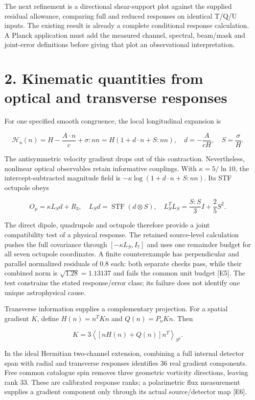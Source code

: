 \documentclass[
  10pt,
]{article}
\begin{document}
The next refinement is a directional shear-support plot against the
supplied residual allowance, comparing full and reduced responses on
identical T/Q/U inputs. The existing result is already a complete
conditional response calculation. A Planck application must add the
measured channel, spectral, beam/mask and joint-error definitions before
giving that plot an observational interpretation.

\hypertarget{kinematic-quantities-from-optical-and-transverse-responses}{%
\section{2. Kinematic quantities from optical and transverse
responses}\label{kinematic-quantities-from-optical-and-transverse-responses}}

For one specified smooth congruence, the local longitudinal expansion is

\[
\mathcal H_u(n)=H-\frac{A\cdot n}{c}+\sigma:nn
=H(1+d\cdot n+S:nn),
\quad d=-\frac{A}{cH},\quad S=\frac\sigma H.
\]

The antisymmetric velocity gradient drops out of this contraction.
Nevertheless, nonlinear optical observables retain informative
couplings. With \(\kappa=5/\ln10\), the intercept-subtracted magnitude
field is \(-\kappa\log(1+d\cdot n+S:nn)\). Its STF octupole obeys

\[
O_\mu=\kappa L_Sd+R_3,
\quad L_Sd=\operatorname{STF}(d\otimes S),
\quad L_S^TL_S=\frac{S:S}{3}I+\frac25S^2.
\]

The direct dipole, quadrupole and octupole therefore provide a joint
compatibility test of a physical response. The retained source-level
calculation pushes the full covariance through \([ -\kappa L_S,I_7]\)
and uses one remainder budget for all seven octupole coordinates. A
finite counterexample has perpendicular and parallel normalized
residuals of 0.8 each: both separate checks pass, while their combined
norm is \(\sqrt{1.28}=1.13137\) and fails the common unit budget
{[}E5{]}. The test constrains the stated response/error class; its
failure does not identify one unique astrophysical cause.

Transverse information supplies a complementary projection. For a
spatial gradient \(K\), define \(H(n)=n^TKn\) and \(Q(n)=P_nKn\). Then

\[
K=3\left\langle[nH(n)+Q(n)]n^T\right\rangle_{S^2}.
\]

In the ideal Hermitian two-channel extension, combining a full internal
detector span with radial and transverse responses identifies 36 real
gradient components. Free common catalogue spin removes three geometric
vorticity directions, leaving rank 33. These are calibrated response
ranks; a polarimetric flux measurement supplies a gradient component
only through its actual source/detector map {[}E6{]}.
\end{document}
